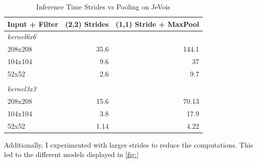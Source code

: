 \documentclass{article}
\begin{document}
\begin{table}[htbp]
	\caption{Inference Time Strides vs Pooling on JeVois}
	\begin{center}
		\begin{tabular}{|l|r|r|}
			\hline
			\textbf{Input + Filter} & \multicolumn{1}{l|}{\textbf{(2,2) Strides}} & \multicolumn{1}{l|}{\textbf{(1,1) Stride + MaxPool}} \\ \hline
			\textit{kernel6x6} & \multicolumn{1}{l|}{} & \multicolumn{1}{l|}{} \\ \hline
			208x208 & 35.6 & 144.1 \\ \hline
			104x104 & 9.6 & 37 \\ \hline
			52x52 & 2.6 & 9.7 \\ \hline
			& \multicolumn{1}{l|}{} & \multicolumn{1}{l|}{} \\ \hline
			\textit{kernel3x3} & \multicolumn{1}{l|}{} & \multicolumn{1}{l|}{} \\ \hline
			208x208 & 15.6 & 70.13 \\ \hline
			104x104 & 3.8 & 17.9 \\ \hline
			52x52 & 1.14 & 4.22 \\ \hline
		\end{tabular}
	\end{center}
	\label{tab:strides}
\end{table}

Additionally, I experimented with larger strides to reduce the computations. This led to the different models displayed in \autoref{fig:}
\end{document}
